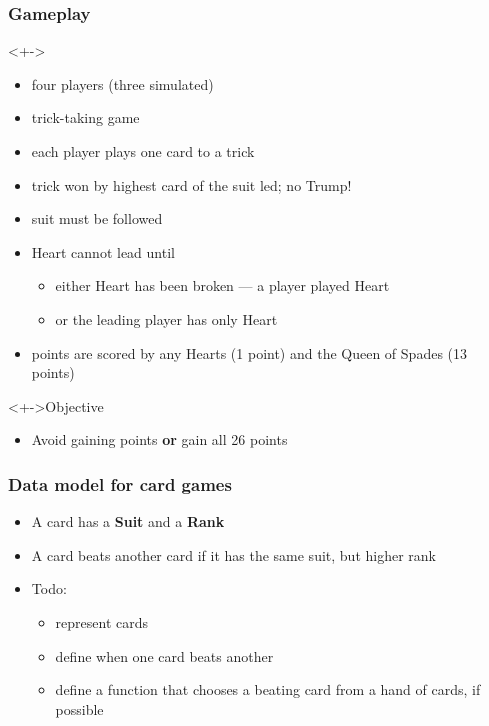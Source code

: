\documentclass{beamer}
\begin{document}
\begin{frame}
  \frametitle{Gameplay}
  \begin{block}<+->{}
    \begin{itemize}
    \item four players (three simulated)
    \item trick-taking game
    \item each player plays one card to a trick
    \item trick won by highest card of the suit led; no Trump!
    \item suit must be followed
    \item Heart cannot lead until
      \begin{itemize}
      \item either Heart has been broken --- a player played Heart
      \item or the leading player has only Heart
      \end{itemize}
    \item points are scored by any Hearts (1 point) and the Queen of Spades (13 points) 
    \end{itemize}
  \end{block}
  \begin{block}<+->{Objective}
    \begin{itemize}
    \item Avoid gaining points \textbf{or} gain all 26 points
    \end{itemize}
  \end{block}
  
\end{frame}
\begin{frame}
  \frametitle{Data model for card games}
  \begin{itemize}
  \item A card has a \textbf{Suit} and a \textbf{Rank}
  \item A card beats another card if it has the same suit, but higher rank
  \item Todo:
    \begin{itemize}
    \item represent cards
    \item define when one card beats another
    \item define a function that chooses a beating card from a hand of
      cards, if possible
    \end{itemize}
  \end{itemize}
\end{frame}
\end{document}
